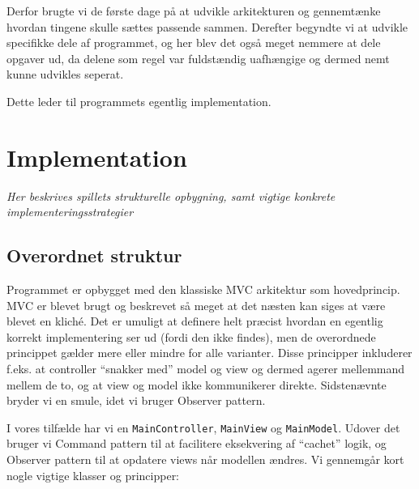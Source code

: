 \documentclass[titlepage,danish]{article}
\newcommand{\code}[1]{\texttt{#1}}
\begin{document}
Derfor brugte vi de første dage på at udvikle arkitekturen og gennemtænke hvordan tingene skulle
sættes passende sammen. Derefter begyndte vi at udvikle specifikke dele af programmet, og her blev
det også meget nemmere at dele opgaver ud, da delene som regel var fuldstændig uafhængige og dermed
nemt kunne udvikles seperat.

Dette leder til programmets egentlig implementation.

\section{Implementation}
\emph{Her beskrives spillets strukturelle opbygning, samt vigtige konkrete implementeringsstrategier}
\subsection{Overordnet struktur}
Programmet er opbygget med den klassiske MVC arkitektur som hovedprincip. MVC er blevet brugt og
beskrevet så meget at det næsten kan siges at være blevet en kliché. Det er umuligt at definere helt
præcist hvordan en egentlig korrekt implementering ser ud (fordi den ikke findes), men de
overordnede princippet gælder mere eller mindre for alle varianter. Disse principper inkluderer
f.eks. at controller ``snakker med'' model og view og dermed agerer mellemmand mellem de to, og at
view og model ikke kommunikerer direkte. Sidstenævnte bryder vi en smule, idet vi bruger Observer
pattern.

I vores tilfælde har vi en \code{MainController}, \code{MainView} og \code{MainModel}. Udover det
bruger vi Command pattern til at facilitere eksekvering af ``cachet'' logik, og Observer pattern til
at opdatere views når modellen ændres. Vi gennemgår kort nogle vigtige klasser og principper:
\end{document}
